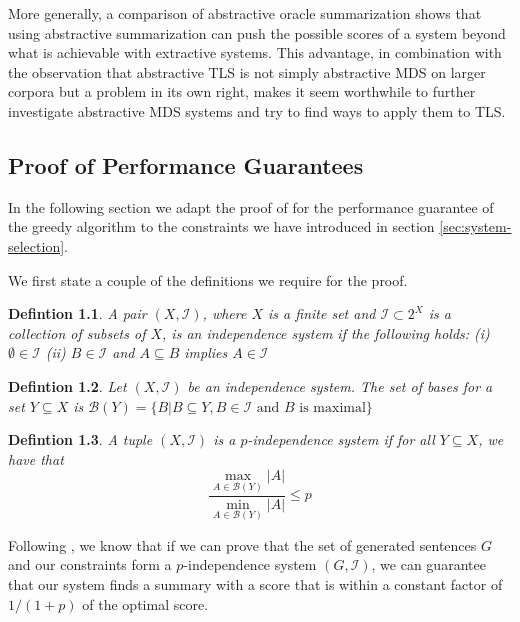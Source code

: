 \documentclass[a4paper,BCOR=10mm]{report}
\numberwithin{lemma}{chapter}
\newtheorem{definition}{Defintion}
\numberwithin{definition}{chapter}
\begin{document}
More generally, a comparison of abstractive oracle summarization shows that using abstractive summarization can push the possible scores of a system beyond what is achievable with extractive systems. This advantage, in combination with the observation that abstractive TLS is not simply abstractive MDS on larger corpora but a problem in its own right, makes it seem worthwhile to further investigate abstractive MDS systems and try to find ways to apply them to TLS.


 


\begin{appendices}
\chapter{Proof of Performance Guarantees}

In the following section we adapt the proof of \citet{markert} for the performance guarantee of the greedy algorithm to the constraints we have introduced in section \ref{sec:system-selection}.

We first state a couple of the definitions we require for the proof.

\begin{definition}
A pair $(X, \mathcal{I})$, where $X$ is a finite set and $\mathcal{I} \subset 2^X$ is a collection of subsets of $X$, is an independence system if the following holds: (i) $\emptyset \in \mathcal{I}$ (ii) $B \in \mathcal{I}$ and $A \subseteq B$ implies $A \in \mathcal{I}$
\end{definition}

\begin{definition}
Let $(X, \mathcal{I})$ be an independence system. The set of bases for a set $Y \subseteq X$ is $\mathcal{B}(Y) = \{B | B \subseteq Y, B \in \mathcal{I} \text{ and } B \text{ is maximal} \}$
\end{definition}


\begin{definition}
A tuple $(X, \mathcal{I})$ is a $p$-independence system if for all $Y \subseteq X$, we have that
\begin{equation}
 \frac{\max_{A \in \mathcal{B}(Y)} |A|}{\min_{A \in \mathcal{B}(Y)} |A|} \leq p
\end{equation}
\end{definition}

Following \citet{markert}, we know that if we can prove that the set of generated sentences $G$ and our constraints form a $p$-independence system $(G, \mathcal{I})$, we can guarantee that our system finds a summary with a score that is within a constant factor of $1 / (1 + p)$ of the optimal score.


\end{appendices}
\end{document}
